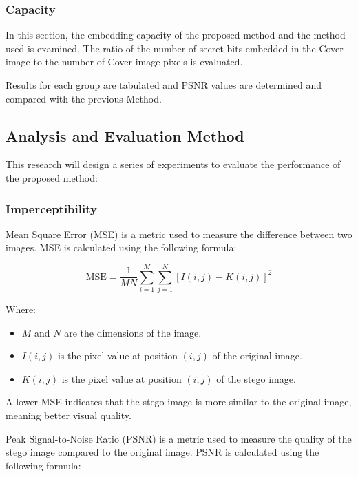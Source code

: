 \documentclass{ittelkom}
\begin{document}
\subsubsection{Capacity}

In this section, the embedding capacity of the proposed method and the method
used is examined. The ratio of the number of secret bits embedded in the Cover
image to the number of Cover image pixels is evaluated.

Results for each group are tabulated and PSNR values are determined and
compared with the previous Method.

\subsection{Analysis and Evaluation Method}

This research will design a series of experiments to evaluate the performance
of the proposed method:

\subsubsection{Imperceptibility}


Mean Square Error (MSE) is a metric used to measure the difference between two
images. MSE is calculated using the following formula:

\begin{equation}
    \text{MSE} = \frac{1}{MN} \sum_{i=1}^{M} \sum_{j=1}^{N} [I(i,j) - K(i,j)]^2
\end{equation}

Where:
\begin{itemize}
    \item $M$ and $N$ are the dimensions of the image.
    \item $I(i,j)$ is the pixel value at position $(i,j)$ of the original image.
    \item $K(i,j)$ is the pixel value at position $(i,j)$ of the stego image.
\end{itemize}

A lower MSE indicates that the stego image is more similar to the original
image, meaning better visual quality.

Peak Signal-to-Noise Ratio (PSNR) is a metric used to measure the quality of
the stego image compared to the original image. PSNR is calculated using the
following formula:
\end{document}
